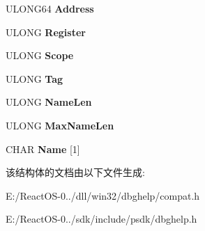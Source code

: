 \begin{DoxyCompactItemize}
\mbox{\label{struct___s_y_m_b_o_l___i_n_f_o_aaa493fa54a3cccdd8c7b7633ca63520e}} 
U\+L\+O\+N\+G64 {\bfseries Address}
\item 
\mbox{\label{struct___s_y_m_b_o_l___i_n_f_o_aad5826bf33193a6b584692543ba7cb8b}} 
U\+L\+O\+NG {\bfseries Register}
\item 
\mbox{\label{struct___s_y_m_b_o_l___i_n_f_o_a7351c808a1e511fd7447293012686b20}} 
U\+L\+O\+NG {\bfseries Scope}
\item 
\mbox{\label{struct___s_y_m_b_o_l___i_n_f_o_a26ab191c20e554fabdb76e26be99241e}} 
U\+L\+O\+NG {\bfseries Tag}
\item 
\mbox{\label{struct___s_y_m_b_o_l___i_n_f_o_a65c5c59549d23b38afc5c3fd9c7230d2}} 
U\+L\+O\+NG {\bfseries Name\+Len}
\item 
\mbox{\label{struct___s_y_m_b_o_l___i_n_f_o_ae476a5a3e8c319b19b28379ace4e068c}} 
U\+L\+O\+NG {\bfseries Max\+Name\+Len}
\item 
\mbox{\label{struct___s_y_m_b_o_l___i_n_f_o_a9c259421b2376d6ce3e36ca79a48c23b}} 
C\+H\+AR {\bfseries Name} \mbox{[}1\mbox{]}
\end{DoxyCompactItemize}


该结构体的文档由以下文件生成\+:\begin{DoxyCompactItemize}
\item 
E\+:/\+React\+O\+S-\/0../dll/win32/dbghelp/compat.\+h\item 
E\+:/\+React\+O\+S-\/0../sdk/include/psdk/dbghelp.\+h\end{DoxyCompactItemize}

